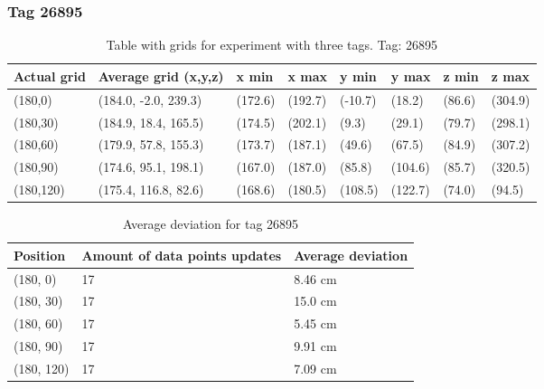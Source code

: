 \subsubsection{Tag 26895}
\begin{table}[H] 
    \begin{tabular}{|l|l|l|l|l|l|l|l|}
    \hline
    Actual grid & Average grid (x,y,z)        & x min      & x max       & y min      & y max   & z min   & z max    \\ \hline
    (180,0) 	& (184.0, -2.0, 239.3) 	 & (172.6) 	& (192.7)	& (-10.7)	 & (18.2) 	 & (86.6)	 & (304.9)	\\ \hline
    (180,30) 	& (184.9, 18.4, 165.5) 	 & (174.5) 	& (202.1)	& (9.3)	 & (29.1) 	 & (79.7)	 & (298.1)	\\ \hline
    (180,60) 	& (179.9, 57.8, 155.3) 	 & (173.7) 	& (187.1)	& (49.6)	 & (67.5) 	 & (84.9)	 & (307.2)	\\ \hline
    (180,90) 	& (174.6, 95.1, 198.1) 	 & (167.0) 	& (187.0)	& (85.8)	 & (104.6) 	 & (85.7)	 & (320.5)	\\ \hline
    (180,120) 	& (175.4, 116.8, 82.6) 	 & (168.6) 	& (180.5)	& (108.5)	 & (122.7) 	 & (74.0)	 & (94.5)	\\ \hline
    \end{tabular}
\label{Tab:three-tag-experiment-result-tag-26895}
\caption{Table with grids for experiment with three tags. Tag: 26895}
\end{table}

\begin{table}[H]
    \centering
    \begin{tabular}{|l|l|l|}
    \hline
    Position   & Amount of data points updates  & Average deviation \\ \hline
    (180, 0)   & 17                             & 8.46 cm             \\ \hline
    (180, 30)  & 17                             & 15.0 cm             \\ \hline
    (180, 60)  & 17                             & 5.45 cm              \\ \hline
    (180, 90)  & 17                             & 9.91 cm              \\ \hline
    (180, 120) & 17                             & 7.09 cm              \\ \hline
    \end{tabular}
\caption{Average deviation for tag 26895}
\end{table}

